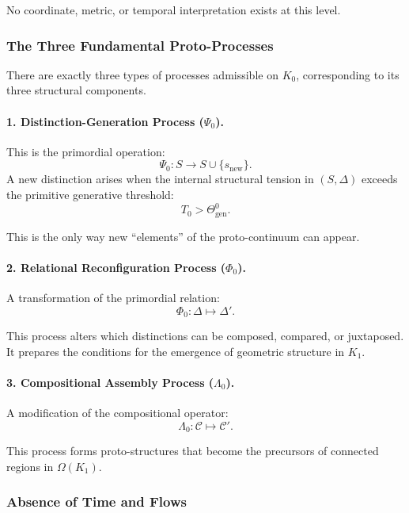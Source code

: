 No coordinate, metric, or temporal interpretation exists at this level.

\subsubsection{The Three Fundamental Proto-Processes}

There are exactly three types of processes admissible on $K_0$,
corresponding to its three structural components.

\paragraph{1. Distinction-Generation Process (\texorpdfstring{$\Psi_0$}{\Psi_0}).}

This is the primordial operation:
\[
\Psi_0: S \to S \cup \{s_{\mathrm{new}}\}.
\]
A new distinction arises when the internal structural tension in
$(S,\Delta)$ exceeds the primitive generative threshold:
\[
T_0 > \Theta_{\mathrm{gen}}^0.
\]

This is the only way new ``elements'' of the proto-continuum can appear.

\paragraph{2. Relational Reconfiguration Process (\texorpdfstring{$\Phi_0$}{\Phi_0}).}

A transformation of the primordial relation:
\[
\Phi_0: \Delta \mapsto \Delta'.
\]

This process alters which distinctions can be composed, compared, or
juxtaposed. It prepares the conditions for the emergence of geometric
structure in $K_1$.

\paragraph{3. Compositional Assembly Process (\texorpdfstring{$\Lambda_0$}{\Lambda_0}).}

A modification of the compositional operator:
\[
\Lambda_0: \mathcal{C} \mapsto \mathcal{C}'.
\]

This process forms proto-structures that become the precursors of connected
regions in $\Omega(K_1)$.

\subsubsection{Absence of Time and Flows}

